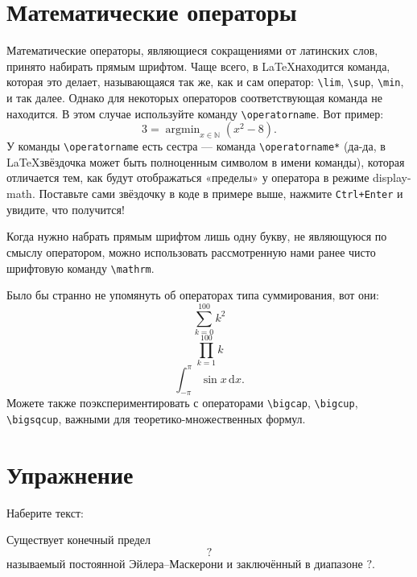 \section{Математические операторы}
\par Математические операторы, являющиеся сокращениями от латинских слов, принято набирать прямым шрифтом. Чаще всего, в \LaTeX находится команда, которая это делает, называющаяся так же, как и сам оператор: \verb"\lim", \verb"\sup", \verb"\min", и так далее. Однако для некоторых операторов соответствующая команда не находится. В этом случае используйте команду \verb"\operatorname".\index{\operatorname} Вот пример: \[3=\operatorname{argmin}_{x\in\mathbb{N}}(x^2-8).\] У команды \verb"\operatorname" есть сестра --- команда \verb"\operatorname*" (да-да, в \LaTeX звёздочка может быть полноценным символом в имени команды), которая отличается тем, как будут отображаться «пределы» у оператора в режиме display-math. Поставьте сами звёздочку в коде в примере выше, нажмите \verb"Ctrl+Enter" и увидите, что получится!
\par Когда нужно набрать прямым шрифтом лишь одну букву, не являющуюся по смыслу оператором, можно использовать рассмотренную нами ранее чисто шрифтовую команду \verb"\mathrm".\index{\mathrm}
\par Было бы странно не упомянуть об операторах типа суммирования, вот они:
\[\sum_{k=0}^{100} k^2\]
\[\prod_{k=1}^{100} k\]
\[\int_{-\pi}^\pi\sin x\,\mathrm{d}x.\]
Можете также поэкспериментировать с операторами \verb"\bigcap", \verb"\bigcup", \verb"\bigsqcup", важными для теоретико-множественных формул.

\section{Упражнение}
\begin{staticpart}
Наберите текст: 
\end{staticpart}
\par Существует конечный предел \[?\] называемый постоянной Эйлера--Маскерони и заключённый в диапазоне \(?\).

